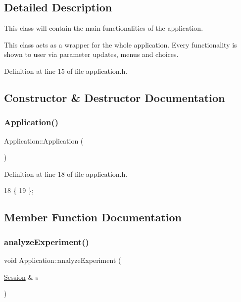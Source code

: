 \subsection{Detailed Description}
This class will contain the main functionalities of the application. 

This class acts as a wrapper for the whole application. Every functionality is shown to user via parameter updates, menus and choices. 

Definition at line 15 of file application.\+h.



\subsection{Constructor \& Destructor Documentation}
\mbox{\label{class_application_afa8cc05ce6b6092be5ecdfdae44e05f8}} 
\subsubsection{\texorpdfstring{Application()}{Application()}}
{\footnotesize\ttfamily Application\+::\+Application (\begin{DoxyParamCaption}{ }\end{DoxyParamCaption})\hspace{0.3cm}{\ttfamily [inline]}}



Definition at line 18 of file application.\+h.


\begin{DoxyCode}
18                  \{
19     \};
\end{DoxyCode}


\subsection{Member Function Documentation}
\mbox{\label{class_application_ae0d3919fe03bae0b3ce31ef4be49374d}} 
\subsubsection{\texorpdfstring{analyze\+Experiment()}{analyzeExperiment()}}
{\footnotesize\ttfamily void Application\+::analyze\+Experiment (\begin{DoxyParamCaption}\item[{\hyperlink{struct_session}{Session} \&}]{s }\end{DoxyParamCaption})}




